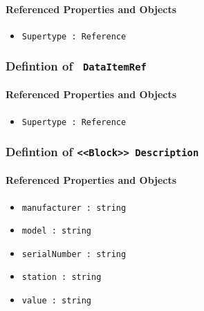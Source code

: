\FloatBarrier



\FloatBarrier
\paragraph{Referenced Properties and Objects}

\begin{itemize}
\item \texttt{Supertype : Reference}

\end{itemize}
\FloatBarrier
\subsubsection{Defintion of \texttt{ DataItemRef}}
  \label{type:DataItemRef}

\FloatBarrier



\FloatBarrier
\paragraph{Referenced Properties and Objects}

\begin{itemize}
\item \texttt{Supertype : Reference}

\end{itemize}
\FloatBarrier
\subsubsection{Defintion of \texttt{<<Block>> Description}}
  \label{type:Description}

\FloatBarrier



\FloatBarrier
\paragraph{Referenced Properties and Objects}

\begin{itemize}
\item \texttt{manufacturer : string}

\item \texttt{model : string}

\item \texttt{serialNumber : string}

\item \texttt{station : string}

\item \texttt{value : string}

\end{itemize}
\FloatBarrier
